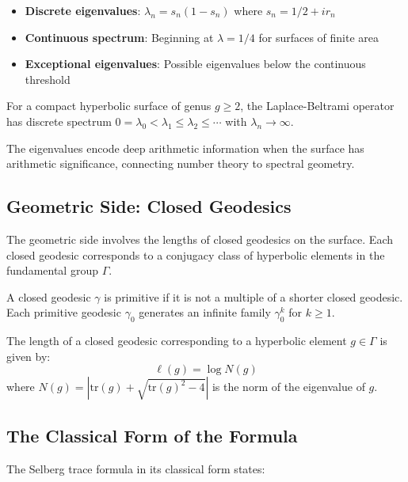 \begin{itemize}
\item \textbf{Discrete eigenvalues}: $\lambda_n = s_n(1-s_n)$ where $s_n = 1/2 + ir_n$
\item \textbf{Continuous spectrum}: Beginning at $\lambda = 1/4$ for surfaces of finite area
\item \textbf{Exceptional eigenvalues}: Possible eigenvalues below the continuous threshold
\end{itemize}

\begin{theorem}
\label{thm:selberg_spectral}
For a compact hyperbolic surface of genus $g \geq 2$, the Laplace-Beltrami operator has discrete spectrum $0 = \lambda_0 < \lambda_1 \leq \lambda_2 \leq \cdots$ with $\lambda_n \to \infty$.
\end{theorem}

The eigenvalues encode deep arithmetic information when the surface has arithmetic significance, connecting number theory to spectral geometry.

\subsection{Geometric Side: Closed Geodesics}

The geometric side involves the lengths of closed geodesics on the surface. Each closed geodesic corresponds to a conjugacy class of hyperbolic elements in the fundamental group $\Gamma$.

\begin{definition}
\label{def:primitive_geodesic}
A closed geodesic $\gamma$ is primitive if it is not a multiple of a shorter closed geodesic. Each primitive geodesic $\gamma_0$ generates an infinite family $\gamma_0^k$ for $k \geq 1$.
\end{definition}

The length of a closed geodesic corresponding to a hyperbolic element $g \in \Gamma$ is given by:
$$\ell(g) = \log N(g)$$
where $N(g) = |\mathrm{tr}(g) + \sqrt{\mathrm{tr}(g)^2 - 4}|$ is the norm of the eigenvalue of $g$.

\subsection{The Classical Form of the Formula}

The Selberg trace formula in its classical form states:

